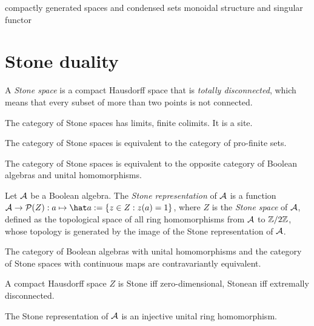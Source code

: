 \documentclass{../../large}
\begin{document}
compactly generated spaces and condensed sets
monoidal structure and singular functor


\section{Stone duality}
\begin{prb}
A \emph{Stone space} is a compact Hausdorff space that is \emph{totally disconnected}, which means that every subset of more than two points is not connected.

The category of Stone spaces has limits, finite colimits.
It is a site.
\begin{parts}
\item The category of Stone spaces is equivalent to the category of pro-finite sets.
\item The category of Stone spaces is equivalent to the opposite category of Boolean algebras and unital homomorphisms.
\end{parts}
\end{prb}





\begin{prb}
Let $\mathcal{A}$ be a Boolean algebra.
The \emph{Stone representation} of $\mathcal{A}$ is a function $\cA\to\cP(Z):a\mapsto\hat a:=\{z\in Z:z(a)=1\}$, where $Z$ is the \emph{Stone space} of $\mathcal{A}$, defined as the topological space of all ring homomorphisms from $\mathcal{A}$ to $\mathbb{Z}/2\mathbb{Z}$, whose topology is generated by the image of the Stone representation of $\mathcal{A}$.

\begin{parts}
\item The category of Boolean algebras with unital homomorphisms and the category of Stone spaces with continuous maps are contravariantly equivalent.
\end{parts}
\end{prb}
\begin{pf}

A compact Hausdorff space $Z$ is Stone iff zero-dimensional, Stonean iff extremally disconnected.

The Stone representation of $\mathcal{A}$ is an injective unital ring homomorphism.

\end{pf}
\end{document}
